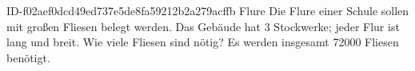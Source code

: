 \begin{exercise}
      {ID-f02aef0dcd49ed737e5de8fa59212b2a279acffb}
      {Flure}
  \ifproblem\problem
    Die Flure einer Schule sollen mit  großen Fliesen belegt werden.
    Das Gebäude hat \num{3} Stockwerke; jeder Flur ist  lang und 
    breit. Wie viele Fliesen sind nötig?
  \fi
  \ifoutcome\outcome
    Es werden insgesamt \num{72000} Fliesen benötigt.
  \fi
\end{exercise}
